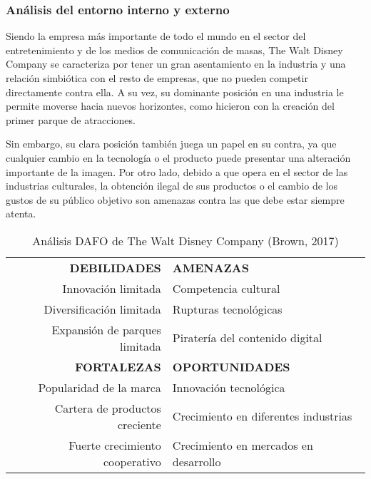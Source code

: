\subsubsection{Análisis del entorno interno y externo}

Siendo la empresa más importante de todo el mundo en el sector del entretenimiento y de los medios de comunicación de masas, The Walt Disney Company se caracteriza por tener un gran asentamiento en la industria y una relación simbiótica con el resto de empresas, que no pueden competir directamente contra ella. A su vez, su dominante posición en una industria le permite moverse hacia nuevos horizontes, como hicieron con la creación del primer parque de atracciones.

Sin embargo, su clara posición también juega un papel en su contra, ya que cualquier cambio en la tecnología o el producto puede presentar una alteración importante de la imagen. Por otro lado, debido a que opera en el sector de las industrias culturales, la obtención ilegal de sus productos o el cambio de los gustos de su público objetivo son amenazas contra las que debe estar siempre atenta.

\begin{table}[]
\centering
\begin{tabular}{rl}
\textbf{DEBILIDADES} & \textbf{AMENAZAS} \\
Innovación limitada & Competencia cultural \\
Diversificación limitada & Rupturas tecnológicas \\
Expansión de parques limitada & Piratería del contenido digital \\
\textbf{FORTALEZAS} & \textbf{OPORTUNIDADES} \\
Popularidad de la marca & Innovación tecnológica \\
Cartera de productos creciente & Crecimiento en diferentes industrias \\
Fuerte crecimiento cooperativo & Crecimiento en mercados en desarrollo \\
\end{tabular}
\caption{\label{fig:frog}Análisis DAFO de The Walt Disney Company (Brown, 2017)}
\end{table}